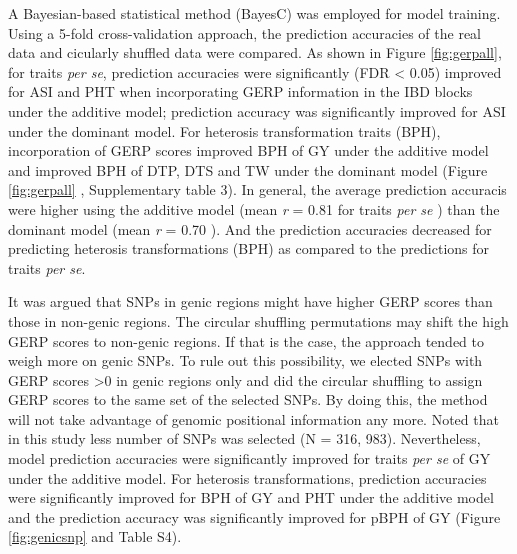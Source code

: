 \documentclass[9pt,twocolumn,twoside]{gsajnl}
\begin{document}
A Bayesian-based statistical method (BayesC) \citep{habier2011extension} was employed for model training. Using a 5-fold cross-validation approach, the prediction accuracies of the real data and cicularly shuffled data were compared. As shown in Figure \ref{fig:gerpall}, for traits \emph{per se}, prediction accuracies were significantly (FDR < 0.05) improved for ASI and PHT when incorporating GERP information in the IBD blocks under the additive model; prediction accuracy was significantly improved for ASI under the dominant model. For heterosis transformation traits (BPH\DIFdelbegin {}\DIFdelend ), incorporation of GERP scores improved BPH of GY under the additive model and improved BPH of DTP, DTS and TW under the dominant model \DIFdelbegin {}\DIFdelend (Figure \ref{fig:gerpall} \DIFdelbegin {}\DIFdelend \DIFaddbegin {}\DIFaddend , Supplementary table 3). In general, the average prediction accuracis were higher using the additive model (mean \emph{r} = 0.81 \DIFdelbegin {}\DIFdelend \DIFaddbegin {}\DIFaddend for traits \emph{per se} \DIFdelbegin {}\DIFdelend \DIFaddbegin {}\DIFaddend ) than the dominant model (mean \emph{r} = 0.70 \DIFdelbegin {}\DIFdelend \DIFaddbegin {}\DIFaddend ). And the prediction accuracies decreased for predicting heterosis transformations (BPH\DIFdelbegin {}\DIFdelend ) as compared to the predictions for traits \emph{per se}.

It was argued that SNPs in genic regions might have higher GERP scores than those in non-genic regions. The circular shuffling permutations may shift the high GERP scores to non-genic regions. If that is the case, the approach tended to weigh more on genic SNPs. To rule out this possibility, we elected SNPs with GERP scores >0 in genic regions only and did the circular shuffling to assign GERP scores to the same set of the selected SNPs. By doing this, the method will not take advantage of genomic positional information any more. Noted that in this study less number of SNPs was selected (N = 316, 983). Nevertheless, model prediction accuracies were significantly improved for traits \emph{per se} of GY under the additive model. For heterosis transformations, prediction accuracies were significantly improved for BPH of GY and PHT under the additive model and the prediction accuracy was significantly improved for pBPH of GY (Figure \ref{fig:genicsnp} and Table S4).   
\end{document}
